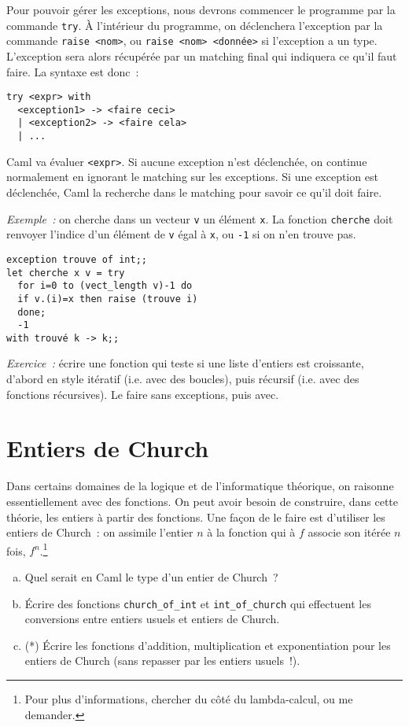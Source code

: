 \documentclass[10pt,a4paper]{article}
\begin{document}
Pour pouvoir gérer les exceptions, nous devrons commencer le programme par la commande \texttt{try}. À l'intérieur du programme, on déclenchera l'exception par la commande \texttt{raise <nom>}, ou \texttt{raise <nom> <donnée>} si l'exception a un type. L'exception sera alors récupérée par un matching final qui indiquera ce qu'il faut faire.
\newpage
La syntaxe est donc~:
\begin{verbatim}try <expr> with
  <exception1> -> <faire ceci>
  | <exception2> -> <faire cela>
  | ...
\end{verbatim}
Caml va évaluer \texttt{<expr>}. Si aucune exception n'est déclenchée, on continue normalement en ignorant le matching sur les exceptions. Si une exception est déclenchée, Caml la recherche dans le matching pour savoir ce qu'il doit faire.

\emph{Exemple~:} on cherche dans un vecteur \texttt{v} un élément \texttt{x}. La fonction \texttt{cherche} doit renvoyer l'indice d'un élément de \texttt{v} égal à \texttt{x}, ou \texttt{-1} si on n'en trouve pas.
\begin{verbatim}exception trouve of int;;
let cherche x v = try
  for i=0 to (vect_length v)-1 do
  if v.(i)=x then raise (trouve i)
  done;
  -1
with trouvé k -> k;;
\end{verbatim}

\emph{Exercice~:} écrire une fonction qui teste si une liste d'entiers est croissante, d'abord en style itératif (i.e. avec des boucles), puis récursif (i.e. avec des fonctions récursives). Le faire sans exceptions, puis avec.

\section{Entiers de Church}
Dans certains domaines de la logique et de l'informatique théorique, on raisonne essentiellement avec des fonctions. On peut avoir besoin de construire, dans cette théorie, les entiers à partir des fonctions. Une façon de le faire est d'utiliser les entiers de Church~: on assimile l'entier $n$ à la fonction qui à $f$ associe son itérée $n$ fois, $f^n$.\footnote{Pour plus d'informations, chercher du côté du lambda-calcul, ou me demander.}
\begin{enumerate}[a)]
\item Quel serait en Caml le type d'un entier de Church~?
\item Écrire des fonctions \texttt{church\_of\_int} et \texttt{int\_of\_church} qui effectuent les conversions entre entiers usuels et entiers de Church.
\item (*) Écrire les fonctions d'addition, multiplication et exponentiation pour les entiers de Church (sans repasser par les entiers usuels~!).
\end{enumerate}
\end{document}
